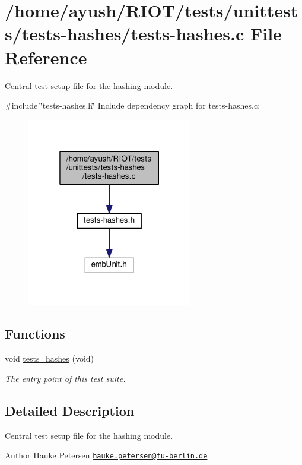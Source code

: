 \hypertarget{tests-hashes_8c}{}\section{/home/ayush/\+R\+I\+O\+T/tests/unittests/tests-\/hashes/tests-\/hashes.c File Reference}
\label{tests-hashes_8c}


Central test setup file for the hashing module.  


{\ttfamily \#include \char`\"{}tests-\/hashes.\+h\char`\"{}}\newline
Include dependency graph for tests-\/hashes.c\+:
\nopagebreak
\begin{figure}[H]
\begin{center}
\leavevmode
\includegraphics[width=205pt]{tests-hashes_8c__incl}
\end{center}
\end{figure}
\subsection*{Functions}
\begin{DoxyCompactItemize}
\item 
void \hyperlink{group__unittests_gac9c042435ff4e2597166100b86226d2a}{tests\+\_\+hashes} (void)
\begin{DoxyCompactList}\small\item\em The entry point of this test suite. \end{DoxyCompactList}\end{DoxyCompactItemize}


\subsection{Detailed Description}
Central test setup file for the hashing module. 

\begin{DoxyAuthor}{Author}
Hauke Petersen \href{mailto:hauke.petersen@fu-berlin.de}{\tt hauke.\+petersen@fu-\/berlin.\+de} 
\end{DoxyAuthor}
